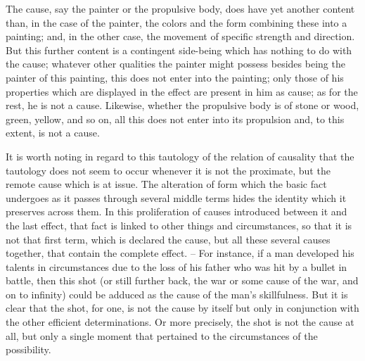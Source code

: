 The cause, say the painter or the propulsive body, does have yet another
content than, in the case of the painter, the colors and the form combining
these into a painting; and, in the other case, the movement of specific
strength and direction. But this further content is a contingent side-being
which has nothing to do with the cause; whatever other qualities the painter
might possess besides being the painter of this painting, this does not enter
into the painting; only those of his properties which are displayed in the
effect are present in him as cause; as for the rest, he is not a cause. Likewise,
whether the propulsive body is of stone or wood, green, yellow, and so
on, all this does not enter into its propulsion and, to this extent, is not a
cause.

It is worth noting in regard to this tautology of the relation of causality
that the tautology does not seem to occur whenever it is not the proximate,
but the remote cause which is at issue. The alteration of form which the
basic fact undergoes as it passes through several middle terms hides the
identity which it preserves across them. In this proliferation of causes
introduced between it and the last effect, that fact is linked to other things
and circumstances, so that it is not that first term, which is declared the
cause, but all these several causes together, that contain the complete effect. –
For instance, if a man developed his talents in circumstances due to the
loss of his father who was hit by a bullet in battle, then this shot (or still
further back, the war or some cause of the war, and on to infinity) could
be adduced as the cause of the man’s skillfulness. But it is clear that the
shot, for one, is not the cause by itself but only in conjunction with the
other efficient determinations. Or more precisely, the shot is not the cause
at all, but only a single moment that pertained to the circumstances of the
possibility.

